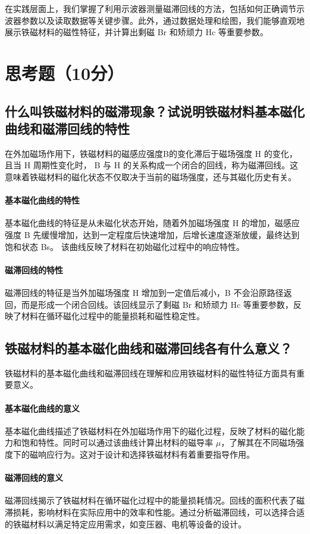 \documentclass[]{../template/Report}%
\begin{document}
\begin{fullreportonly}
在实践层面上，我们掌握了利用示波器测量磁滞回线的方法，包括如何正确调节示波器参数以及读取数据等关键步骤。此外，通过数据处理和绘图，我们能够直观地展示铁磁材料的磁性特征，并计算出剩磁 Br 和矫顽力 Hc 等重要参数。


\section{思考题（10分）}
\subsection{什么叫铁磁材料的磁滞现象？试说明铁磁材料基本磁化曲线和磁滞回线的特性}
在外加磁场作用下，铁磁材料的磁感应强度B的变化滞后于磁场强度 H 的变化，且当 H 周期性变化时，
B 与 H 的关系构成一个闭合的回线，称为磁滞回线。这意味着铁磁材料的磁化状态不仅取决于当前的磁场强度，还与其磁化历史有关。

\paragraph{基本磁化曲线的特性} 基本磁化曲线的特征是从未磁化状态开始，随着外加磁场强度 H 的增加，磁感应强度 B 先缓慢增加，达到一定程度后快速增加，后增长速度逐渐放缓，最终达到饱和状态 Bs。
该曲线反映了材料在初始磁化过程中的响应特性。

\paragraph{磁滞回线的特性} 磁滞回线的特征是当外加磁场强度 H 增加到一定值后减小，B 不会沿原路径返回，而是形成一个闭合回线。该回线显示了剩磁 Br 和矫顽力 Hc 等重要参数，反映了材料在循环磁化过程中的能量损耗和磁性稳定性。

\subsection{铁磁材料的基本磁化曲线和磁滞回线各有什么意义？}
铁磁材料的基本磁化曲线和磁滞回线在理解和应用铁磁材料的磁性特征方面具有重要意义。
\paragraph{基本磁化曲线的意义} 基本磁化曲线描述了铁磁材料在外加磁场作用下的磁化过程，反映了材料的磁化能力和饱和特性。同时可以通过该曲线计算出材料的磁导率 $\mu$，了解其在不同磁场强度下的磁响应行为。这对于设计和选择铁磁材料有着重要指导作用。
\paragraph{磁滞回线的意义} 磁滞回线揭示了铁磁材料在循环磁化过程中的能量损耗情况。回线的面积代表了磁滞损耗，影响材料在实际应用中的效率和性能。通过分析磁滞回线，可以选择合适的铁磁材料以满足特定应用需求，如变压器、电机等设备的设计。


\end{fullreportonly}
\end{document}
